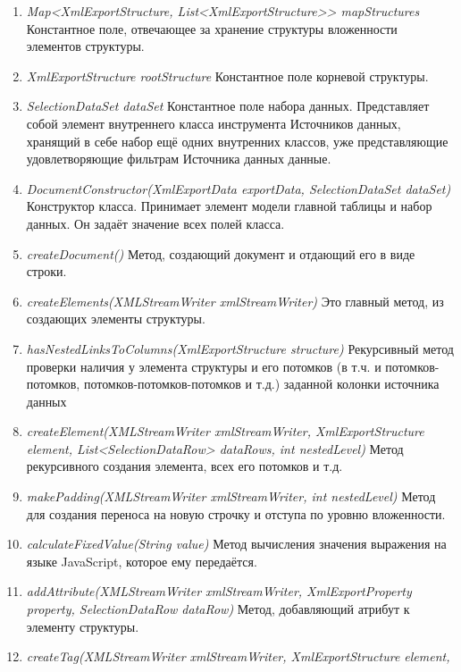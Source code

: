 \documentclass[a4paper,12pt]{diplom}
\begin{document}
\begin{enumerate}[label=\arabic{enumi})]
    \item \textit{Map<XmlExportStructure, List<XmlExportStructure>> mapStructures} Константное поле, отвечающее за хранение структуры вложенности элементов структуры.
    \item \textit{XmlExportStructure rootStructure} Константное поле корневой структуры.
    \item \textit{SelectionDataSet dataSet} Константное поле набора данных. Представляет собой элемент внутреннего класса инструмента Источников данных, хранящий в себе набор ещё одних внутренних классов, уже представляющие удовлетворяющие фильтрам Источника данных данные.
    \item \textit{DocumentConstructor(XmlExportData exportData, SelectionDataSet dataSet)} Конструктор класса. Принимает элемент модели главной таблицы и набор данных. Он задаёт значение всех полей класса.
    \item \textit{createDocument()} Метод, создающий документ и отдающий его в виде строки.
    \item \textit{createElements(XMLStreamWriter xmlStreamWriter)} Это главный метод, из создающих элементы структуры.
    \item \textit{hasNestedLinksToColumns(XmlExportStructure structure)} Рекурсивный метод проверки наличия у элемента структуры и его потомков (в т.ч. и потомков-потомков, потомков-потомков-потомков и т.д.) заданной колонки источника данных
    \item \textit{createElement(XMLStreamWriter xmlStreamWriter, XmlExportStructure element, List<SelectionDataRow> dataRows, int nestedLevel)} Метод рекурсивного создания элемента, всех его потомков и т.д.
    \item \textit{makePadding(XMLStreamWriter xmlStreamWriter, int nestedLevel)} Метод для создания переноса на новую строчку и отступа по уровню вложенности.
    \item \textit{calculateFixedValue(String value)} Метод вычисления значения выражения на языке JavaScript, которое ему передаётся.
    \item \textit{addAttribute(XMLStreamWriter xmlStreamWriter, XmlExportProperty property, \newline
    SelectionDataRow dataRow)} Метод, добавляющий атрибут к элементу структуры.
    \item \textit{createTag(XMLStreamWriter xmlStreamWriter, XmlExportStructure element, \newline
}
\end{enumerate}
\end{document}
